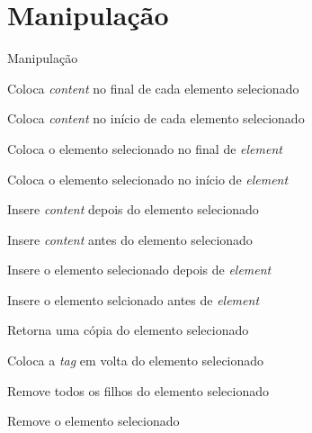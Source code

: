 \section{Manipulação}
\begin{frame}{Manipulação}
\begin{description}
	\pause \item[\$(...).append('content')] Coloca \textit{content} no final de cada elemento selecionado
	\pause \item[\$(...).prepend('content')] Coloca \textit{content} no início de cada elemento selecionado
	\pause \item[\$(...).appendTo(element)] Coloca o elemento selecionado no final de \textit{element}
	\pause \item[\$(...).prependTo(element)] Coloca o elemento selecionado no início de \textit{element}
	\pause \item[\$(...).after('content')] Insere \textit{content} depois do elemento selecionado
	\pause \item[\$(...).before('content')] Insere \textit{content} antes do elemento selecionado
	\pause \item[\$(...).insertAfter(element)] Insere o elemento selecionado depois de \textit{element}
	\pause \item[\$(...).insertBefore(element)] Insere o elemento selcionado antes de \textit{element}
	\pause \item[\$(...).clone()] Retorna uma cópia do elemento selecionado
	\pause \item[\$(...).wrap('\textless{}tag\textgreater\textless\/tag\textgreater')] Coloca a \textit{tag} em volta do elemento selecionado
	\pause \item[\$(...).empty()] Remove todos os filhos do elemento selecionado
	\pause \item[\$(...).remove()] Remove o elemento selecionado
\end{description}
\end{frame}
